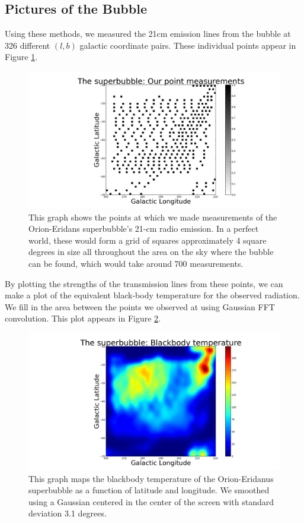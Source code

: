 \documentclass[11pt]{article}
\begin{document}
\subsection{Pictures of the Bubble}
Using these methods, we measured the 21cm emission lines from the bubble at 326 different $(l, b)$ galactic coordinate pairs. These individual points appear in Figure \ref{points}.

\begin{figure}
\centering
\includegraphics[scale=0.35]{garphs/points}
\caption{This graph shows the points at which we made measurements of the Orion-Eridans superbubble's 21-cm radio emission. In a perfect world, these would form a grid of squares approximately 4 square degrees in size all throughout the area on the sky where the bubble can be found, which would take around 700 measurements. \label{points}}
\end{figure} 

By plotting the strengths of the transmission lines from these points, we can make a plot of the equivalent black-body temperature for the observed radiation. We fill in the area between the points we observed at using Gaussian FFT convolution. This plot appears in Figure \ref{blackbody}.

\begin{figure}
\centering
\includegraphics[scale=0.35]{garphs/blackbody}
\caption{This graph maps the blackbody temperature of the Orion-Eridanus superbubble as a function of latitude and longitude. We smoothed using a Gaussian centered in the center of the screen with standard deviation 3.1 degrees. \label{blackbody}}
\end{figure} 
\end{document}
